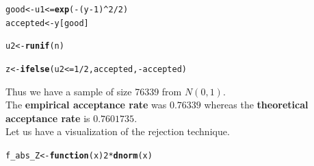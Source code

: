 \documentclass[11pt, a4paper]{article}\usepackage[]{graphicx}\usepackage[]{xcolor}
\makeatletter
\newcommand{\hlnum}[1]{\textcolor[rgb]{0.686,0.059,0.569}{#1}}%
\newcommand{\hlopt}[1]{\textcolor[rgb]{0,0,0}{#1}}%
\newcommand{\hldef}[1]{\textcolor[rgb]{0.345,0.345,0.345}{#1}}%
\newcommand{\hlkwa}[1]{\textcolor[rgb]{0.161,0.373,0.58}{\textbf{#1}}}%
\newcommand{\hlkwb}[1]{\textcolor[rgb]{0.69,0.353,0.396}{#1}}%
\newcommand{\hlkwc}[1]{\textcolor[rgb]{0.333,0.667,0.333}{#1}}%
\newcommand{\hlkwd}[1]{\textcolor[rgb]{0.737,0.353,0.396}{\textbf{#1}}}%
\newenvironment{kframe}{%
 \def\at@end@of@kframe{}%
 \ifinner\ifhmode%
  \def\at@end@of@kframe{\end{minipage}}%
  \begin{minipage}{\columnwidth}%
 \fi\fi%
 \def\FrameCommand##1{\hskip\@totalleftmargin \hskip-\fboxsep
 \colorbox{shadecolor}{##1}\hskip-\fboxsep
     \hskip-\linewidth \hskip-\@totalleftmargin \hskip\columnwidth}%
 \MakeFramed {\advance\hsize-\width
   \@totalleftmargin\z@ \linewidth\hsize
   \@setminipage}}%
 {\par\unskip\endMakeFramed%
 \at@end@of@kframe}
\newenvironment{knitrout}{}{} %
\makeatother
\begin{document}
\begin{knitrout}
\color{fgcolor}\begin{kframe}
\begin{alltt}
\hldef{good} \hlkwb{<-} \hldef{u1} \hlopt{<=} \hlkwd{exp}\hldef{(}\hlopt{-}\hldef{(y} \hlopt{-} \hlnum{1}\hldef{)}\hlopt{^}\hlnum{2} \hlopt{/} \hlnum{2}\hldef{)}
\hldef{accepted} \hlkwb{<-} \hldef{y[good]}
\end{alltt}
\end{kframe}
\end{knitrout}

\begin{knitrout}
\color{fgcolor}\begin{kframe}
\begin{alltt}
\hldef{u2} \hlkwb{<-} \hlkwd{runif}\hldef{(n)}
\end{alltt}
\end{kframe}
\end{knitrout}

\begin{knitrout}
\color{fgcolor}\begin{kframe}
\begin{alltt}
\hldef{z} \hlkwb{<-} \hlkwd{ifelse}\hldef{(u2} \hlopt{<=} \hlnum{1}\hlopt{/}\hlnum{2}\hldef{, accepted,} \hlopt{-}\hldef{accepted)}
\end{alltt}
\end{kframe}
\end{knitrout}

Thus we have a sample of size 76339 from $N(0, 1)$. \\[1em]

The \textbf{empirical acceptance rate} was $0.76339$ whereas the \textbf{theoretical acceptance rate} is $0.7601735$. \\[0.2em]

Let us have a visualization of the rejection technique.

\begin{knitrout}
\color{fgcolor}\begin{kframe}
\begin{alltt}
\hldef{f_abs_Z} \hlkwb{<-} \hlkwa{function}\hldef{(}\hlkwc{x}\hldef{)} \hlnum{2} \hlopt{*} \hlkwd{dnorm}\hldef{(x)}
\end{alltt}
\end{kframe}
\end{knitrout}
\end{document}
